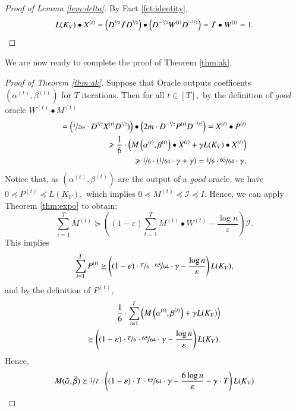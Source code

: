 \documentclass[twoside,leqno,twocolumn]{article}
\newcommand{\nfrac}{\nicefrac}
\renewcommand{\geq}{\geqslant}
\newcommand{\cI}{\mathcal I}
\newcommand{\e}{\epsilon}
\let\e\varepsilon
\newcommand{\Deg}{D^{\nfrac{1}{2}}}
\newcommand{\Degin}{D^{-\nfrac{1}{2}}}
\numberwithin{equation}{section}
\begin{document}
\begin{proof}[Proof of Lemma \ref{lem:delta}]
By Fact \ref{fct:identity},
$$
 L(K_V) \bullet X^{(t)} = \left(\Deg \cI \Deg\right) \bullet \left(\Degin W^{(t)} \Degin\right) = \cI \bullet W^{(t)} = 1.
$$
\end{proof}
              
We are now ready to complete the proof of Theorem \ref{thm:ak}.                                                                                                                                                                                                                                                                                                                                                                                               \begin{proof}[Proof of Theorem \ref{thm:ak}]
Suppose that {\sc Oracle}\xspace outputs coefficents $\left(\alpha^{(t)}, \beta^{(t)}\right)$ for $T$ iterations.
Then for all $t \in [T],$ by the definition of {\it good} oracle $W^{(t)} \bullet M^{(t)}$
\begin{align*}
 = \left(\nfrac{1}{2m} \cdot \Deg X^{(t)} \Deg)\right) \bullet \left(2m \cdot \Degin P^{(t)} \Degin\right) = X^{(t)} \bullet P^{(t)} \\
\geq \frac{1}{6} \cdot \left( M\left(\alpha^{(t)}, \beta^{(t)}\right) \bullet X^{(t)} + \gamma L(K_V) \bullet X^{(t)} \right)\\
\geq \nfrac{1}{6} \cdot \left(\nfrac{1}{64} \cdot \gamma + \gamma\right) = \nfrac{1}{6} \cdot \nfrac{65}{64} \cdot \gamma. 
\end{align*}
Notice that, as $\left(\alpha^{(t)}, \beta^{(t)}\right)$ are the output of a {\it good} oracle, we have
$0  \preceq P^{(t)} \preceq L(K_V),$ which implies $0 \preceq M^{(t)} \preceq \cI \preceq I.$
Hence, we can apply Theorem \ref{thm:expo} to obtain:
$$
\sum_{i=1}^T M^{(t)} \succeq \left((1-\e)\sum_{t=1}^T M^{(t)} \bullet W^{(t)} - \frac{\log n}{\e}\right)\cI.
$$
This implies
$$
\sum_{i=1}^T P^{(t)} \succeq \left((1-\e) \cdot \nfrac{T}{6} \cdot \nfrac{65}{64} \cdot \gamma - \frac{\log n}{\e}\right)L(K_V),
$$
and by the definition of $P^{(t)},$
\begin{align*}
\frac{1}{6}  \cdot \sum_{i=1}^T \left( M\left(\alpha^{(t)}, \beta^{(t)}\right) + \gamma L(K_V) \right) \\
\succeq \left((1-\e) \cdot \nfrac{T}{6} \cdot \nfrac{65}{64} \cdot \gamma - \frac{\log n}{\e}\right)L(K_V).
\end{align*}
Hence,
$$
M(\bar{\alpha}, \bar{\beta}) \succeq \nfrac{1}{T} \cdot \left((1-\e) \cdot T \cdot  \nfrac{65}{64} \cdot \gamma - \frac{6 \log n}{\e} - \gamma\cdot T \right)L(K_V)
$$
\end{proof}
\end{document}
